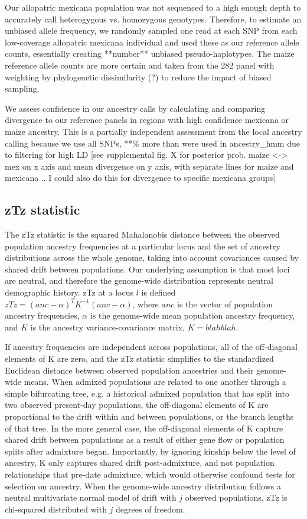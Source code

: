 \documentclass[12pt]{report}
\begin{document}
Our allopatric mexicana population was not sequenced to a high enough depth to accurately call heterogygous vs. homozygous genotypes. Therefore, to estimate an unbiased allele frequency, we randomly sampled one read at each SNP from each low-coverage allopatric mexicana individual and used these as our reference allele counts, essentially creating **number** unbiased pseudo-haplotypes. The maize reference allele counts are more certain and taken from the 282 panel with weighting by phylogenetic dissimilarity (?) to reduce the impact of biased sampling.\par

We assess confidence in our ancestry calls by calculating and comparing divergence to our reference panels in regions with high confidence mexicana or maize ancestry. This is a partially independent assessment from the local ancestry calling because we use all SNPs, **\% more than were used in ancestry\_hmm due to filtering for high LD [see supplemental fig. X for posterior prob. maize <-> mex on x axis and mean divergence on y axis, with separate lines for maize and mexicana .. I could also do this for divergence to specific mexicana groups] \par

\subsection{zTz statistic}
The zTz statistic is the squared Mahalanobis distance between the observed population ancestry frequencies at a particular locus and the set of ancestry distributions across the whole genome, taking into account covariances caused by shared drift between populations. Our underlying assumption is that most loci are neutral, and therefore the genome-wide distribution represents neutral demographic history. zTz at a locus $l$ is defined 
$zTz=(anc - \alpha)^{T}K^{-1}(anc - \alpha)$,
where $anc$ is the vector of population ancestry frequencies, $\alpha$ is the genome-wide mean population ancestry frequency, and $K$ is the ancestry variance-covariance matrix,
$K = blah blah$.

If ancestry frequencies are independent across populations, all of the off-diagonal elements of K are zero, and the zTz statistic simplifies to the standardized Euclidean distance between observed population ancestries and their genome-wide means. When admixed populations are related to one another through a simple bifurcating tree, e.g. a historical admixed population that has split into two observed present-day populations, the off-diagonal elements of K are proportional to the drift within and between populations, or the branch lengths of that tree. In the more general case, the off-diagonal elements of K capture shared drift between populations as a result of either gene flow or population splits after admixture began. Importantly, by ignoring kinship below the level of ancestry, K only captures shared drift post-admixture, and not population relationships that pre-date admixture, which would otherwise confound tests for selection on ancestry. When the genome-wide ancestry distribution follows a neutral multivariate normal model of drift with $j$ observed populations, zTz is chi-squared distributed with $j$ degrees of freedom. 
\end{document}
